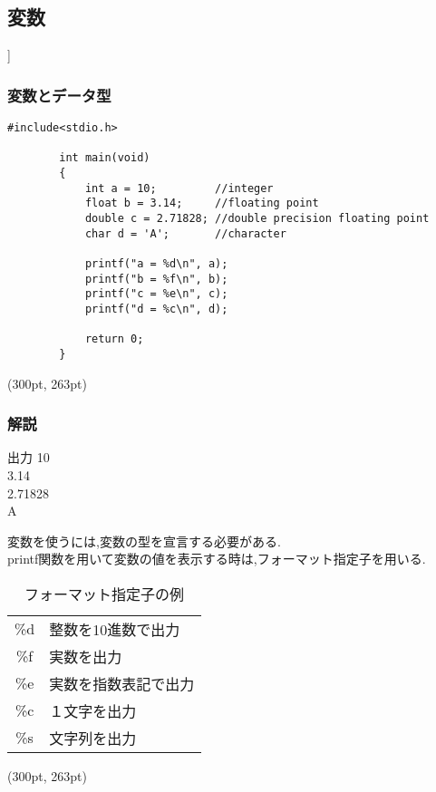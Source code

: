 \documentclass[dvipdfmx]{beamer}
\begin{document}
\subsection{変数}
\begin{frame}[t, fragile]]
    \frametitle{変数とデータ型}
    \begin{lstlisting}[gobble=8, caption=variable.c, label=variable]
        #include<stdio.h>

        int main(void)
        {
            int a = 10;         //integer 
            float b = 3.14;     //floating point 
            double c = 2.71828; //double precision floating point
            char d = 'A';       //character 

            printf("a = %d\n", a);
            printf("b = %f\n", b);
            printf("c = %e\n", c);
            printf("d = %c\n", d);

            return 0;
        }
    \end{lstlisting}
    \begin{textblock*}{0.3\linewidth}(300pt, 263pt)
    \space
    \end{textblock*}
\end{frame}

\begin{frame}[t, fragile]
    \frametitle{解説}
    \begin{block}{出力}
    10\\
    3.14\\
    2.71828\\
    A
    \end{block}
    変数を使うには,変数の型を宣言する必要がある.\\
    printf関数を用いて変数の値を表示する時は,フォーマット指定子を用いる.
    \begin{table}[h]
        \caption{フォーマット指定子の例}
        \label{format}
        \centering
        \vspace{-5pt}
        \begin{tabular}{cl}
            \hline
            \%d & 整数を10進数で出力\\
            \%f & 実数を出力\\
            \%e & 実数を指数表記で出力\\
            \%c & １文字を出力\\
            \%s & 文字列を出力\\
            \hline
        \end{tabular}
    \end{table}
    \begin{textblock*}{0.3\linewidth}(300pt, 263pt)
    \space
    \end{textblock*}
\end{frame}
\end{document}

